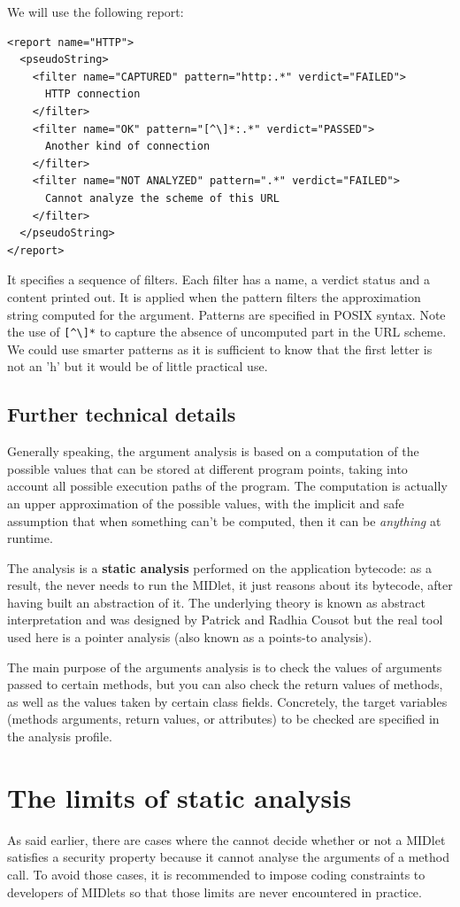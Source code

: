 We will use the following report:
\begin{verbatim}
<report name="HTTP">
  <pseudoString>
  	<filter name="CAPTURED" pattern="http:.*" verdict="FAILED">
  	  HTTP connection
  	</filter>
  	<filter name="OK" pattern="[^\]*:.*" verdict="PASSED">
  	  Another kind of connection
  	</filter>
  	<filter name="NOT ANALYZED" pattern=".*" verdict="FAILED">
  	  Cannot analyze the scheme of this URL
  	</filter>
  </pseudoString>
</report>
\end{verbatim}
It specifies a sequence of filters. Each filter has a name, a verdict status and
a content printed out. It is applied when the pattern filters the approximation
string computed for the argument. Patterns are specified in POSIX syntax. Note
the use of \verb![^\]*! to capture the absence of uncomputed part in the URL
scheme. We could use smarter patterns as it is sufficient to know that the first
letter is not an 'h' but it would be of little practical use.

\subsection{Further technical details}
Generally speaking, the argument analysis is based
on a computation of the possible values that can be stored at 
different program points, taking into account all possible execution
paths of the program. The computation is actually an upper
approximation of the possible values, with the implicit and safe assumption
that when something can't be computed, then it can be \emph{anything}
at runtime. 

The analysis is a \textbf{static analysis} performed on the
application bytecode: as a result, the \ma never needs to run the
MIDlet, it just reasons about its bytecode, after having built an
abstraction of it. The underlying theory is known as abstract interpretation and
was designed by Patrick and Radhia Cousot but the real tool used here is
a pointer analysis (also known as a points-to analysis).


The main purpose of the arguments analysis is to check the values of
arguments passed to certain methods, but you can also check the return
values of methods, as well as the values taken by certain class fields.
Concretely, the target variables (methods arguments, return values, or
attributes) to be checked are specified in the analysis profile. 

\section{The limits of static analysis}
As said earlier, there are cases where the \ma cannot decide whether or not
a MIDlet satisfies a security property because it cannot analyse the arguments
of a method call. To avoid those cases, it is recommended to impose 
coding constraints to developers of MIDlets so that those limits are 
never encountered in practice.

